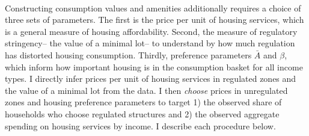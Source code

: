 \documentclass[12pt]{article}
\begin{document}
\paragraph*{}
Constructing consumption values and amenities additionally requires a choice of three sets of parameters. The first is the price per unit of housing services, which is a general measure of housing affordability. Second, the measure of regulatory stringency-- the value of a minimal lot-- to understand by how much regulation has distorted housing consumption. Thirdly, preference parameters $\bar{A}$ and $\beta$, which inform how important housing is in the consumption basket for all income types. I directly infer prices per unit of housing services in regulated zones and the value of a minimal lot from the data. I then \textit{choose} prices in unregulated zones and housing preference parameters to target 1) the observed share of households who choose regulated structures and 2) the observed aggregate spending on housing services by income. I describe each procedure below. 
\end{document}
